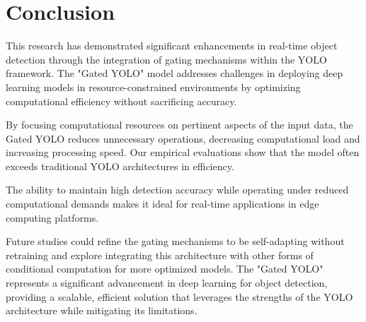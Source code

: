 \section{Conclusion}  

This research has demonstrated significant enhancements in real-time object detection through the integration of gating mechanisms within the YOLO framework. The "Gated YOLO" model addresses challenges in deploying deep learning models in resource-constrained environments by optimizing computational efficiency without sacrificing accuracy.

By focusing computational resources on pertinent aspects of the input data, the Gated YOLO reduces unnecessary operations, decreasing computational load and increasing processing speed. Our empirical evaluations show that the model often exceeds traditional YOLO architectures in efficiency.

The ability to maintain high detection accuracy while operating under reduced computational demands makes it ideal for real-time applications in edge computing platforms.

Future studies could refine the gating mechanisms to be self-adapting without retraining and explore integrating this architecture with other forms of conditional computation for more optimized models. The "Gated YOLO" represents a significant advancement in deep learning for object detection, providing a scalable, efficient solution that leverages the strengths of the YOLO architecture while mitigating its limitations.

\clearpage
